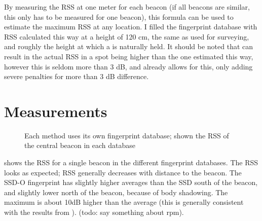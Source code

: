 By measuring the RSS at one meter for each beacon (if all beacons are similar, this only has to be measured for one beacon), this formula can be used to estimate the maximum RSS at any location.
I filled the fingerprint database with RSS calculated this way at a height of 120 cm, the same as used for surveying, and roughly the height at which a \device is naturally held.
It should be noted that \mpp can result in the actual RSS in a spot being higher than the one estimated this way, however this is seldom more than 3 dB, and  already allows for this, only adding severe penalties for more than 3 dB difference.

\section{Measurements}
\begin{figure}[p]
    \begin{subfigure}[b]{0.5\textwidth}
    \end{subfigure}
    \begin{subfigure}[b]{0.5\textwidth}
    \end{subfigure}
    \begin{subfigure}[b]{0.5\textwidth}
    \end{subfigure}
    \begin{subfigure}[b]{0.5\textwidth}
    \end{subfigure}
    \begin{subfigure}[b]{0.5\textwidth}
    \end{subfigure}
    \begin{subfigure}[b]{0.5\textwidth}
    \end{subfigure}
    \caption{Each method uses its own fingerprint database; shown the RSS of the central beacon in each database}
    \label{fig:architecture-heatmaps}
\end{figure}

 shows the RSS for a single beacon in the different fingerprint databases.
The RSS looks as expected; RSS generally decreases with distance to the beacon.
The SSD-O fingerprint has slightly higher averages than the SSD south of the beacon, and slightly lower north of the beacon, because of body shadowing.
The maximum is about 10dB higher than the average (this is generally consistent with the results from ).
(todo: say something about rpm).

